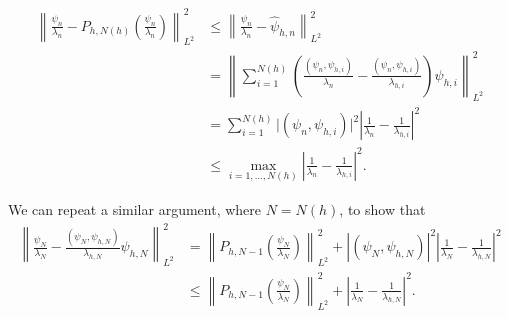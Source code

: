 \begin{align*}
    \left\lVert \frac{\psi_n}{\lambda_n} - P_{h, N(h)}\left( \frac{\psi_n}{\lambda_n} \right) \right\rVert_{L^2}^2
    & \leq \left\lVert \frac{\psi_n}{\lambda_n} - \hat \psi_{h, n} \right\rVert_{L^2}^2 \\
    & = \left\lVert \sum_{i=1}^{N(h)} \left( \frac{(\psi_n, \psi_{h, i})}{\lambda_n} - \frac{(\psi_n, \psi_{h, i})}{\lambda_{h, i}} \right) \psi_{h, i} \right\rVert_{L^2}^2 \\
    & = \sum_{i=1}^{N(h)} \lvert (\psi_n, \psi_{h, i}) \rvert^2 \left\lvert \frac{1}{\lambda_n} - \frac{1}{\lambda_{h, i}} \right\rvert^2 \\
    & \leq \max_{i=1, \dots, N(h)} \left\lvert \frac{1}{\lambda_n} - \frac{1}{\lambda_{h, i}} \right\rvert^2.
\end{align*}



We can repeat a similar argument, where \(N = N(h)\), to show that
\begin{align*}
    \left\lVert \frac{\psi_N}{\lambda_N} - \frac{(\psi_N, \psi_{h, N})}{\lambda_{h, N}} \psi_{h, N} \right\rVert_{L^2}^2
    & = \left\lVert P_{h, N-1}\left( \frac{\psi_N}{\lambda_N} \right)\right\rVert_{L^2}^2
    +  \left\lvert (\psi_N, \psi_{h, N}) \right\rvert^2 \left\lvert \frac{1}{\lambda_N} - \frac{1}{\lambda_{h, N}} \right\rvert^2 \\
    & \leq \left\lVert P_{h, N-1}\left( \frac{\psi_N}{\lambda_N} \right)\right\rVert_{L^2}^2
    +  \left\lvert \frac{1}{\lambda_N} - \frac{1}{\lambda_{h, N}} \right\rvert^2.
\end{align*}
